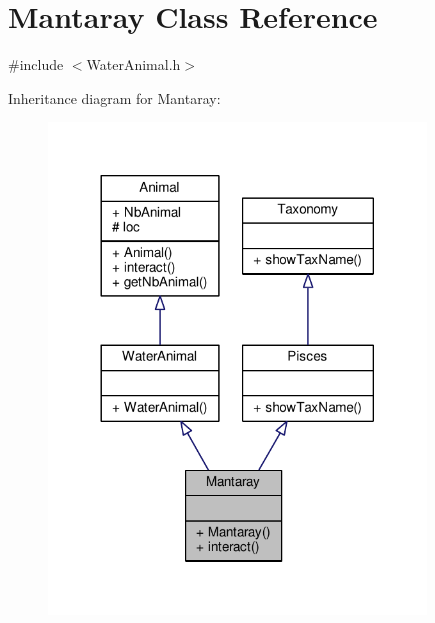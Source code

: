 \hypertarget{classMantaray}{}\section{Mantaray Class Reference}
\label{classMantaray}


{\ttfamily \#include $<$Water\+Animal.\+h$>$}



Inheritance diagram for Mantaray\+:
\nopagebreak
\begin{figure}[H]
\begin{center}
\leavevmode
\includegraphics[width=284pt]{classMantaray__inherit__graph}
\end{center}
\end{figure}


